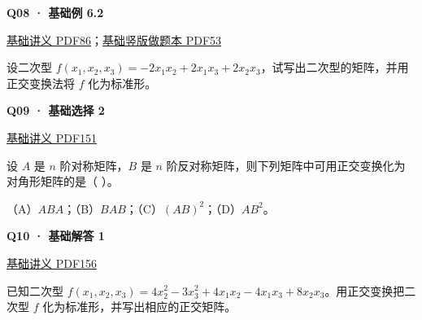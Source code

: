 \documentclass[UTF8,fontset=fandol,11pt,a4paper]{ctexart}
\newcommand{\source}[1]{{\footnotesize\color{Muted}#1\par}}
\newcommand{\qtitle}[2]{\par\needspace{5\baselineskip}\hypertarget{#1}{}\label{#1}\textbf{#2}\par}
\begin{document}
\begin{minipage}{\linewidth}
\qtitle{B-EX-02}{Q08 · 基础例 6.2}
\source{\href{file:///Users/skyintelligence/Desktop/\%E5\%BE\%97\%E8\%AF\%BB\%E4\%B8\%AA\%E7\%A0\%94-\%E5\%8C\%97\%E5\%A4\%A7\%E8\%BD\%AF\%E5\%BE\%AE/\%E6\%95\%B0\%E5\%AD\%A6\%20150/\%E8\%AE\%B2\%E4\%B9\%89/\%E3\%80\%90\%E4\%B8\%80\%E9\%AB\%98\%E6\%95\%B0Kira\%E3\%80\%9127\%E8\%80\%83\%E7\%A0\%94\%E7\%BA\%BF\%E4\%BB\%A3\%E5\%9F\%BA\%E7\%A1\%80\%E8\%AE\%B2\%E4\%B9\%89\%26\%E4\%B9\%A0\%E9\%A2\%98-\%E7\%94\%B5\%E5\%AD\%90\%E7\%89\%88.pdf\#page=86}{基础讲义 PDF86}；\href{file:///Users/skyintelligence/Desktop/\%E5\%BE\%97\%E8\%AF\%BB\%E4\%B8\%AA\%E7\%A0\%94-\%E5\%8C\%97\%E5\%A4\%A7\%E8\%BD\%AF\%E5\%BE\%AE/\%E6\%95\%B0\%E5\%AD\%A6\%20150/\%E8\%AE\%B2\%E4\%B9\%89/\%E3\%80\%90\%E7\%AB\%96\%E7\%89\%88\%E3\%80\%9127\%E8\%80\%83\%E7\%A0\%94Kira\%E7\%BA\%BF\%E4\%BB\%A3\%E5\%9F\%BA\%E7\%A1\%80\%E8\%AE\%B2\%E4\%B9\%89\%E5\%81\%9A\%E9\%A2\%98\%E6\%9C\%AC\%281\%29.pdf\#page=53}{基础竖版做题本 PDF53}}
设二次型 $f(x_1,x_2,x_3)=-2x_1x_2+2x_1x_3+2x_2x_3$，试写出二次型的矩阵，并用正交变换法将 $f$ 化为标准形。
\end{minipage}\par\vspace{7mm}
\begin{minipage}{\linewidth}
\qtitle{B-MC-02}{Q09 · 基础选择 2}
\source{\href{file:///Users/skyintelligence/Desktop/\%E5\%BE\%97\%E8\%AF\%BB\%E4\%B8\%AA\%E7\%A0\%94-\%E5\%8C\%97\%E5\%A4\%A7\%E8\%BD\%AF\%E5\%BE\%AE/\%E6\%95\%B0\%E5\%AD\%A6\%20150/\%E8\%AE\%B2\%E4\%B9\%89/\%E3\%80\%90\%E4\%B8\%80\%E9\%AB\%98\%E6\%95\%B0Kira\%E3\%80\%9127\%E8\%80\%83\%E7\%A0\%94\%E7\%BA\%BF\%E4\%BB\%A3\%E5\%9F\%BA\%E7\%A1\%80\%E8\%AE\%B2\%E4\%B9\%89\%26\%E4\%B9\%A0\%E9\%A2\%98-\%E7\%94\%B5\%E5\%AD\%90\%E7\%89\%88.pdf\#page=151}{基础讲义 PDF151}}
设 $A$ 是 $n$ 阶对称矩阵，$B$ 是 $n$ 阶反对称矩阵，则下列矩阵中可用正交变换化为对角形矩阵的是（ ）。

（A）$ABA$；（B）$BAB$；（C）$(AB)^2$；（D）$AB^2$。
\end{minipage}\par\vspace{7mm}
\begin{minipage}{\linewidth}
\qtitle{B-SA-01}{Q10 · 基础解答 1}
\source{\href{file:///Users/skyintelligence/Desktop/\%E5\%BE\%97\%E8\%AF\%BB\%E4\%B8\%AA\%E7\%A0\%94-\%E5\%8C\%97\%E5\%A4\%A7\%E8\%BD\%AF\%E5\%BE\%AE/\%E6\%95\%B0\%E5\%AD\%A6\%20150/\%E8\%AE\%B2\%E4\%B9\%89/\%E3\%80\%90\%E4\%B8\%80\%E9\%AB\%98\%E6\%95\%B0Kira\%E3\%80\%9127\%E8\%80\%83\%E7\%A0\%94\%E7\%BA\%BF\%E4\%BB\%A3\%E5\%9F\%BA\%E7\%A1\%80\%E8\%AE\%B2\%E4\%B9\%89\%26\%E4\%B9\%A0\%E9\%A2\%98-\%E7\%94\%B5\%E5\%AD\%90\%E7\%89\%88.pdf\#page=156}{基础讲义 PDF156}}
已知二次型 $f(x_1,x_2,x_3)=4x_2^2-3x_3^2+4x_1x_2-4x_1x_3+8x_2x_3$。用正交变换把二次型 $f$ 化为标准形，并写出相应的正交矩阵。
\end{minipage}\par\vspace{7mm}
\end{document}
